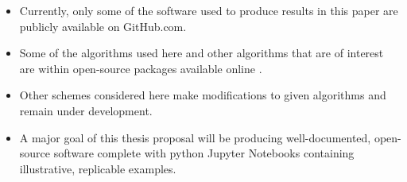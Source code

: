 \documentclass[11pt]{beamer}
\begin{document}
\begin{frame}

\begin{itemize}

	\item Currently, only some of the software used to produce results in this paper are publicly available on GitHub.com. 
	
	\item Some of the algorithms used here and other algorithms that are of interest are within open-source packages available online \footnotemark[1] \footnotemark[2]. 
	
	\item Other schemes considered here make modifications to given algorithms and remain under development. 
	
	\item A major goal of this thesis proposal will be producing well-documented, open-source software complete with python Jupyter Notebooks containing illustrative, replicable examples.


\end{itemize}


\end{frame}



\end{document}
